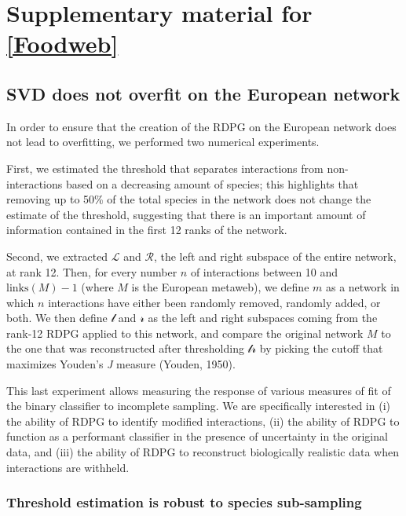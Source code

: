 \anglais
\chapter{Supplementary material for \autoref{Foodweb}}

\section{SVD does not overfit on the European
network}\label{svd-does-not-overfit-on-the-european-network}

In order to ensure that the creation of the RDPG on the European network
does not lead to overfitting, we performed two numerical experiments.

First, we estimated the threshold that separates interactions from
non-interactions based on a decreasing amount of species; this
highlights that removing up to 50\% of the total species in the network
does not change the estimate of the threshold, suggesting that there is
an important amount of information contained in the first 12 ranks of
the network.

Second, we extracted \(\mathcal{L}\) and \(\mathcal{R}\), the left and
right subspace of the entire network, at rank 12. Then, for every number
\(n\) of interactions between 10 and \(\text{links}(M)-1\) (where \(M\)
is the European metaweb), we define \(m\) as a network in which \(n\)
interactions have either been randomly removed, randomly added, or both.
We then define \(\mathcal{l}\) and \(\mathcal{r}\) as the left and right
subspaces coming from the rank-12 RDPG applied to this network, and
compare the original network \(M\) to the one that was reconstructed
after thresholding \(\mathcal{l}\mathcal{r}\) by picking the cutoff that
maximizes Youden's \emph{J} measure (Youden, 1950).

This last experiment allows measuring the response of various measures
of fit of the binary classifier to incomplete sampling. We are
specifically interested in (i) the ability of RDPG to identify modified
interactions, (ii) the ability of RDPG to function as a performant
classifier in the presence of uncertainty in the original data, and
(iii) the ability of RDPG to reconstruct biologically realistic data
when interactions are withheld.

\subsection{Threshold estimation is robust to species
sub-sampling}\label{threshold-estimation-is-robust-to-species-sub-sampling}

